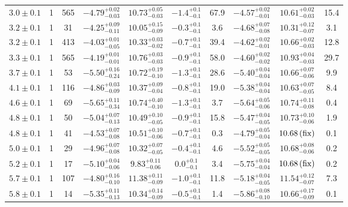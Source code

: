 \documentclass[a4paper,fleqn,usenatbib]{mnras}
\begin{document}
\begin{table*}
\begin{tabular}{ccc | cccc | ccc}
$3.0\pm0.1$ & 1 & 565 & $-4.79^{+0.02}_{-0.03}$ & $10.73^{+0.05}_{-0.03}$ & $-1.4^{+0.1}_{-0.1}$ & 67.9 & $-4.57^{+0.02}_{-0.01}$ & $10.61^{+0.02}_{-0.03}$ & 15.4 \\
$3.2\pm0.1$ & 1 & 31 & $-4.25^{+0.09}_{-0.11}$ & $10.05^{+0.15}_{-0.09}$ & $-0.3^{+0.1}_{-0.1}$ & 3.6 & $-4.68^{+0.07}_{-0.08}$ & $10.31^{+0.12}_{-0.07}$ & 3.1 \\
$3.2\pm0.1$ & 1 & 413 & $-4.03^{+0.01}_{-0.05}$ & $10.33^{+0.03}_{-0.02}$ & $-0.7^{+0.1}_{-0.1}$ & 39.4 & $-4.62^{+0.02}_{-0.01}$ & $10.66^{+0.02}_{-0.03}$ & 12.8 \\
$3.3\pm0.1$ & 1 & 565 & $-4.19^{+0.01}_{-0.01}$ & $10.76^{+0.03}_{-0.03}$ & $-0.9^{+0.1}_{-0.1}$ & 58.0 & $-4.60^{+0.02}_{-0.02}$ & $10.93^{+0.04}_{-0.03}$ & 29.7 \\
$3.7\pm0.1$ & 1 & 53 & $-5.50^{+0.16}_{-0.24}$ & $10.72^{+0.19}_{-0.10}$ & $-1.3^{+0.1}_{-0.1}$ & 28.6 & $-5.40^{+0.04}_{-0.04}$ & $10.66^{+0.07}_{-0.06}$ & 9.9 \\
$4.1\pm0.1$ & 1 & 116 & $-4.86^{+0.03}_{-0.09}$ & $10.37^{+0.09}_{-0.04}$ & $-0.8^{+0.1}_{-0.1}$ & 19.0 & $-5.38^{+0.04}_{-0.04}$ & $10.63^{+0.07}_{-0.05}$ & 8.4 \\
$4.6\pm0.1$ & 1 & 69 & $-5.65^{+0.11}_{-0.34}$ & $10.74^{+0.40}_{-0.10}$ & $-1.3^{+0.1}_{-0.1}$ & 3.7 & $-5.64^{+0.05}_{-0.06}$ & $10.74^{+0.11}_{-0.08}$ & 0.4 \\
$4.8\pm0.1$ & 1 & 50 & $-5.04^{+0.07}_{-0.13}$ & $10.49^{+0.10}_{-0.05}$ & $-0.9^{+0.1}_{-0.1}$ & 15.8 & $-5.47^{+0.04}_{-0.05}$ & $10.73^{+0.10}_{-0.06}$ & 1.9 \\
$4.8\pm0.1$ & 1 & 41 & $-4.53^{+0.07}_{-0.08}$ & $10.51^{+0.10}_{-0.06}$ & $-0.7^{+0.1}_{-0.1}$ & 0.3 & $-4.79^{+0.05}_{-0.04}$ & $10.68\,{\rm (fix)}$ & 0.1 \\
$5.0\pm0.1$ & 1 & 29 & $-4.96^{+0.07}_{-0.08}$ & $10.32^{+0.07}_{-0.05}$ & $-0.4^{+0.1}_{-0.1}$ & 4.6 & $-5.52^{+0.05}_{-0.05}$ & $10.68^{+0.08}_{-0.06}$ & 0.2 \\
$5.2\pm0.1$ & 1 & 17 & $-5.10^{+0.04}_{-0.06}$ & $9.83^{+0.11}_{-0.06}$ & $0.0^{+0.1}_{-0.1}$ & 3.4 & $-5.75^{+0.04}_{-0.04}$ & $10.68\,{\rm (fix)}$ & 0.2 \\
$5.7\pm0.1$ & 1 & 107 & $-4.80^{+0.16}_{-0.10}$ & $11.38^{+0.11}_{-0.09}$ & $-1.0^{+0.1}_{-0.1}$ & 11.8 & $-5.18^{+0.04}_{-0.05}$ & $11.54^{+0.12}_{-0.07}$ & 7.3 \\
$5.8\pm0.1$ & 1 & 14 & $-5.35^{+0.11}_{-0.13}$ & $10.34^{+0.14}_{-0.09}$ & $-0.5^{+0.1}_{-0.1}$ & 1.4 & $-5.86^{+0.08}_{-0.10}$ & $10.66^{+0.17}_{-0.09}$ & 0.1 \\

\end{tabular}
\end{table*}
\end{document}

